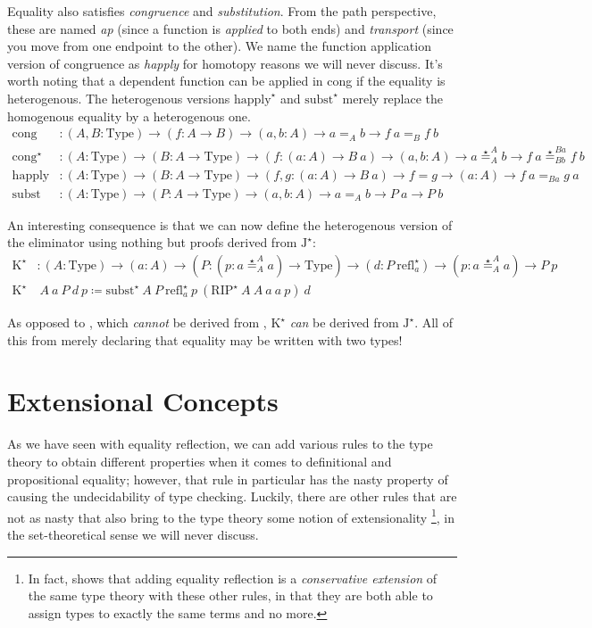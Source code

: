 \documentclass{report}
\newcommand{\const}[1]{\text{#1}}
\newcommand{\Type}{\const{Type}}
\newcommand{\refl}{\const{refl}}
\newcommand{\jelim}{\const{J}\xspace}
\newcommand{\kelim}{\const{K}\xspace}
\newcommand{\rip}{\const{RIP}\xspace}
\newcommand{\subst}{\const{subst}\xspace}
\begin{document}
Equality also satisfies \emph{congruence} and \emph{substitution}. From the path perspective, these are named \emph{ap} (since a function is \emph{applied} to both ends) and \emph{transport} (since you move from one endpoint to the other). We name the function application version of congruence as \emph{happly} for homotopy reasons we will never discuss. It's worth noting that a dependent function can be applied in cong if the equality is heterogenous. The heterogenous versions $\text{happly}^\star$ and $\subst^\star$ merely replace the homogenous equality by a heterogenous one.
%
\begin{align*}
    \text{cong} &: (A, B : \Type) \to (f : A \to B) \to (a, b : A) \to a =_A b \to f ~ a =_B f ~ b \\
    \text{cong}^\star &: (A : \Type) \to (B : A \to \Type) \to (f : (a : A) \to B ~ a) \to (a, b : A) \to a \stareq^A_A b \to f ~ a \stareq^{Ba}_{Bb} f ~ b \\
    \text{happly} &: (A : \Type) \to (B : A \to \Type) \to (f, g : (a : A) \to B ~ a) \to f = g \to (a : A) \to f ~ a =_{B a} g ~ a \\
    \subst &: (A : \Type) \to (P : A \to \Type) \to (a, b : A) \to a =_A b \to P ~ a \to P ~ b
\end{align*}

An interesting consequence is that we can now define the heterogenous version of the \kelim eliminator using nothing but proofs derived from $\jelim^\star$:
%
\begin{align*}
    \kelim^\star &: (A : \Type) \to (a : A) \to (P : (p : a \stareq^A_A a) \to \Type) \to (d : P ~ \refl^\star_a) \to (p : a \stareq^A_A a) \to P ~ p \\
    \kelim^\star &~ A ~ a  ~ P ~ d ~ p \coloneqq \subst^\star ~ A ~ P ~ \refl^\star_a ~ p ~ (\rip^\star ~ A ~ A ~ a ~ a ~ p) ~ d
\end{align*}

As opposed to \kelim, which \emph{cannot} be derived from \jelim, $\kelim^\star$ \emph{can} be derived from $\jelim^\star$. All of this from merely declaring that equality may be written with two types!

\section{Extensional Concepts}

As we have seen with equality reflection, we can add various rules to the type theory to obtain different properties when it comes to definitional and propositional equality; however, that rule in particular has the nasty property of causing the undecidability of type checking. Luckily, there are other rules
that are not as nasty that also bring to the type theory some notion of extensionality%
\footnote{In fact, \citet{ext-concepts} shows that adding equality reflection is a \emph{conservative extension} of the same type theory with these other rules, in that they are both able to assign types to exactly the same terms and no more.}, %
in the set-theoretical sense we will never discuss.
\end{document}
